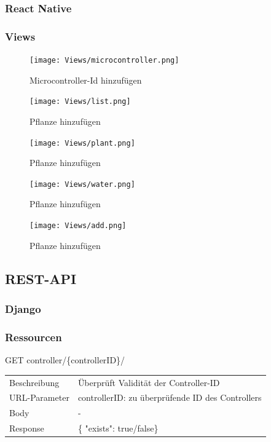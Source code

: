         \subsubsection{React Native}
        \subsubsection{Views}

\begin{figure}[H]
    \centering
    \texttt{[image: Views/microcontroller.png]}
    \caption{Microcontroller-Id hinzufügen}
    \label{microcontroller}
\end{figure}
        
\begin{figure}[H]
    \centering
    \texttt{[image: Views/list.png]}
    \caption{Pflanze hinzufügen}
    \label{add}
\end{figure}

\begin{figure}[H]
    \centering
    \texttt{[image: Views/plant.png]}
    \caption{Pflanze hinzufügen}
    \label{add}
\end{figure}

\begin{figure}[H]
    \centering
    \texttt{[image: Views/water.png]}
    \caption{Pflanze hinzufügen}
    \label{add}
\end{figure}

\begin{figure}[H]
    \centering
    \texttt{[image: Views/add.png]}
    \caption{Pflanze hinzufügen}
    \label{add}
\end{figure}

    \subsection{REST-API}

        \subsubsection{Django}
        \subsubsection{Ressourcen}
        \newcommand{\tabitem}{~~\llap{\textbullet}~~}
     \begin{minipage}{\textwidth}
             GET controller/\{controllerID\}/ 
        
          \begin{tabularx}{\textwidth}{lX}
                \toprule Beschreibung & Überprüft Validität der Controller-ID \\
                URL-Parameter & controllerID: zu überprüfende ID des Controllers \\
                Body & - \\
                Response & \{ "exists": true/false\}
            \end{tabularx}
    \end{minipage}\\\\
        
